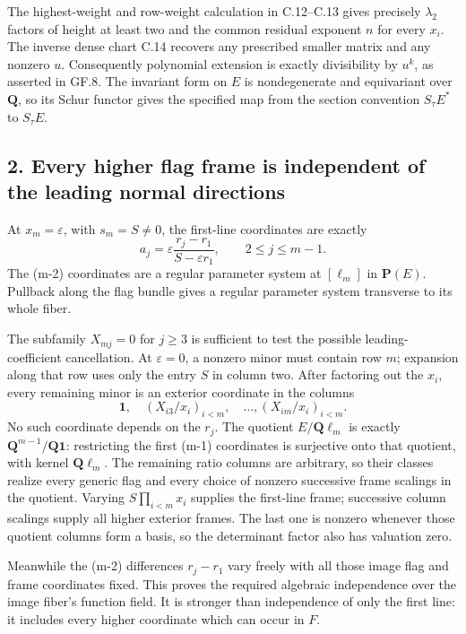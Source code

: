 \documentclass[
  10pt,
]{article}
\begin{document}
The highest-weight and row-weight calculation in C.12--C.13 gives
precisely \(\lambda_2\) factors of height at least two and the common
residual exponent \(n\) for every \(x_i\). The inverse dense chart C.14
recovers any prescribed smaller matrix and any nonzero \(u\).
Consequently polynomial extension is exactly divisibility by \(u^k\), as
asserted in GF.8. The invariant form on \(E\) is nondegenerate and
equivariant over \(\mathbf Q\), so its Schur functor gives the specified
map from the section convention \(S_\tau E^*\) to \(S_\tau E\).

\subsection{2. Every higher flag frame is independent of the leading
normal
directions}\label{every-higher-flag-frame-is-independent-of-the-leading-normal-directions}

At \(x_m=\varepsilon\), with \(s_m=S\ne0\), the first-line coordinates
are exactly \[
a_j=\varepsilon\frac{r_j-r_1}{S-\varepsilon r_1},
\qquad 2\le j\le m-1.
\] The (m-2) coordinates are a regular parameter system at \([\ell_m]\)
in \(\mathbf P(E)\). Pullback along the flag bundle gives a regular
parameter system transverse to its whole fiber.

The subfamily \(X_{mj}=0\) for \(j\ge3\) is sufficient to test the
possible leading-coefficient cancellation. At \(\varepsilon=0\), a
nonzero minor must contain row \(m\); expansion along that row uses only
the entry \(S\) in column two. After factoring out the \(x_i\), every
remaining minor is an exterior coordinate in the columns \[
\mathbf1,\quad (X_{i3}/x_i)_{i<m},\quad\ldots,
(X_{im}/x_i)_{i<m}.
\] No such coordinate depends on the \(r_j\). The quotient
\(E/\mathbf Q\ell_m\) is exactly \(\mathbf Q^{m-1}/\mathbf Q\mathbf1\):
restricting the first (m-1) coordinates is surjective onto that
quotient, with kernel \(\mathbf Q\ell_m\). The remaining ratio columns
are arbitrary, so their classes realize every generic flag and every
choice of nonzero successive frame scalings in the quotient. Varying
\(S\prod_{i<m}x_i\) supplies the first-line frame; successive column
scalings supply all higher exterior frames. The last one is nonzero
whenever those quotient columns form a basis, so the determinant factor
also has valuation zero.

Meanwhile the (m-2) differences \(r_j-r_1\) vary freely with all those
image flag and frame coordinates fixed. This proves the required
algebraic independence over the image fiber's function field. It is
stronger than independence of only the first line: it includes every
higher coordinate which can occur in \(F\).
\end{document}
